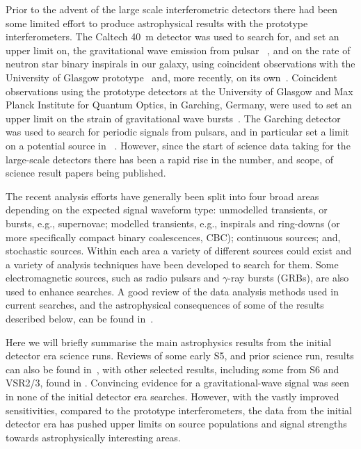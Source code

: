 Prior to the advent of the large scale interferometric detectors there had been some limited effort to 
produce astrophysical results with the prototype interferometers. The Caltech 40~m detector was used to 
search for, and set an upper limit on, the gravitational wave emission from pulsar
~\cite{Hereld:1984}, and on the rate of neutron star binary inspirals in our 
galaxy, using coincident observations with the University of Glasgow prototype~\cite{Smith:1988} and, more 
recently, on its own~\cite{Allen:1999}. Coincident observations using the prototype detectors at the 
University of Glasgow and Max Planck Institute for Quantum Optics, in Garching, Germany, were used to set
an upper limit on the strain of gravitational wave bursts~\cite{Nicholson:1996}. The Garching detector was 
used to search for periodic signals from pulsars, and in particular set a limit on a potential source in
~\cite{Niebauer:1993}. However, since the start of science data taking for the 
large-scale detectors there has been a rapid rise in the number, and scope, of science result papers being
published.

The recent analysis efforts have generally been split into four broad areas depending on the expected signal waveform
type: unmodelled transients, or bursts, e.g., supernovae; modelled transients, e.g., inspirals and ring-downs 
(or more specifically compact binary coalescences, CBC); continuous sources; and, stochastic sources. Within 
each area a variety of different sources could exist and a variety of analysis techniques have been developed 
to search for them. Some electromagnetic sources, such as radio pulsars and $\gamma$-ray bursts (GRBs), are also
used to enhance searches. A good review of the data analysis methods used in current searches, and the 
astrophysical consequences of some of the results described below, can be found in~\cite{Sathyaprakash:2009}.

Here we will briefly summarise the main astrophysics results from the initial detector era science runs.
Reviews of some early S5, and prior science run, results can also be found in~\cite{Papa:2008,
Fairhurst:2009}, with other selected results, including some from S6 and VSR2/3, found in 
\cite{2014GReGr..46.1763B}. Convincing evidence for a gravitational-wave signal was seen in none of the 
initial detector era searches. However, with the vastly improved sensitivities, compared to the prototype 
interferometers, the data from the initial detector era has pushed upper limits on source populations 
and signal strengths towards astrophysically interesting areas.

